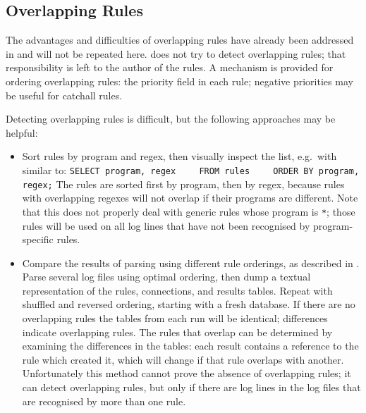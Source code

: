 \subsection{Overlapping Rules}

\label{overlapping rules in implementation}

The advantages and difficulties of overlapping rules have already been
addressed in  and will not be
repeated here.  \parsername{} does not try to detect overlapping rules;
that responsibility is left to the author of the rules.  A mechanism is
provided for ordering overlapping rules: the priority field in each rule;
negative priorities may be useful for catchall rules.

Detecting overlapping rules is difficult, but the following approaches may
be helpful:

\begin{itemize}

    \item Sort rules by program and regex, then visually inspect the list,
        e.g.\ with  similar to:    \newline{}
        \verb!SELECT program, regex!            \newline{}
        \verb!    FROM rules!                   \newline{}
        \verb!    ORDER BY program, regex;!     \newline{}
        The rules are sorted first by program, then by regex, because rules
        with overlapping regexes will not overlap if their programs are
        different.  Note that this does not properly deal with generic
        rules whose program is \texttt{*}; those rules will be used on all
        log lines that have not been recognised by program-specific rules.

    \item Compare the results of parsing using different rule orderings, as
        described in .  Parse
        several log files using optimal ordering, then dump a textual
        representation of the rules, connections, and results tables.
        Repeat with shuffled and reversed ordering, starting with a fresh
        database.  If there are no overlapping rules the tables from each
        run will be identical; differences indicate overlapping rules.
        The rules that overlap can be determined by examining the
        differences in the tables: each result contains a reference to the
        rule which created it, which will change if that rule overlaps with
        another.  Unfortunately this method cannot prove the absence of
        overlapping rules; it can detect overlapping rules, but only if
        there are log lines in the log files that are recognised by more
        than one rule.

\end{itemize}

